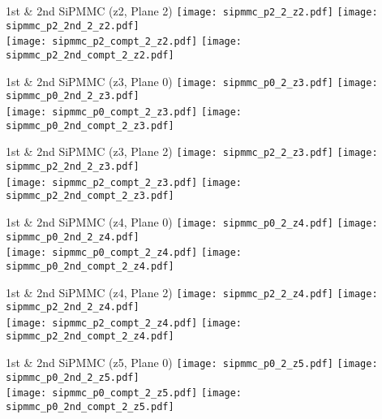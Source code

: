 \documentclass{beamer}
\begin{document}
\begin{frame}{1st \& 2nd SiPMMC (z2, Plane 2)}
	\texttt{[image: sipmmc\_p2\_2\_z2.pdf]}
	\texttt{[image: sipmmc\_p2\_2nd\_2\_z2.pdf]} \\
	
		\texttt{[image: sipmmc\_p2\_compt\_2\_z2.pdf]}
		\texttt{[image: sipmmc\_p2\_2nd\_compt\_2\_z2.pdf]}
\end{frame}

\begin{frame}{1st \& 2nd SiPMMC (z3, Plane 0)}
	\texttt{[image: sipmmc\_p0\_2\_z3.pdf]}
	\texttt{[image: sipmmc\_p0\_2nd\_2\_z3.pdf]} \\
	
		\texttt{[image: sipmmc\_p0\_compt\_2\_z3.pdf]}
		\texttt{[image: sipmmc\_p0\_2nd\_compt\_2\_z3.pdf]}
\end{frame}

\begin{frame}{1st \& 2nd SiPMMC (z3, Plane 2)}
	\texttt{[image: sipmmc\_p2\_2\_z3.pdf]}
	\texttt{[image: sipmmc\_p2\_2nd\_2\_z3.pdf]} \\
	
		\texttt{[image: sipmmc\_p2\_compt\_2\_z3.pdf]}
		\texttt{[image: sipmmc\_p2\_2nd\_compt\_2\_z3.pdf]}
\end{frame}

\begin{frame}{1st \& 2nd SiPMMC (z4, Plane 0)}
	\texttt{[image: sipmmc\_p0\_2\_z4.pdf]}
	\texttt{[image: sipmmc\_p0\_2nd\_2\_z4.pdf]} \\
	
		\texttt{[image: sipmmc\_p0\_compt\_2\_z4.pdf]}
		\texttt{[image: sipmmc\_p0\_2nd\_compt\_2\_z4.pdf]}
\end{frame}

\begin{frame}{1st \& 2nd SiPMMC (z4, Plane 2)}
	\texttt{[image: sipmmc\_p2\_2\_z4.pdf]}
	\texttt{[image: sipmmc\_p2\_2nd\_2\_z4.pdf]} \\
	
		\texttt{[image: sipmmc\_p2\_compt\_2\_z4.pdf]}
		\texttt{[image: sipmmc\_p2\_2nd\_compt\_2\_z4.pdf]}
\end{frame}

\begin{frame}{1st \& 2nd SiPMMC (z5, Plane 0)}
	\texttt{[image: sipmmc\_p0\_2\_z5.pdf]}
	\texttt{[image: sipmmc\_p0\_2nd\_2\_z5.pdf]} \\
	
		\texttt{[image: sipmmc\_p0\_compt\_2\_z5.pdf]}
		\texttt{[image: sipmmc\_p0\_2nd\_compt\_2\_z5.pdf]}
\end{frame}
\end{document}
